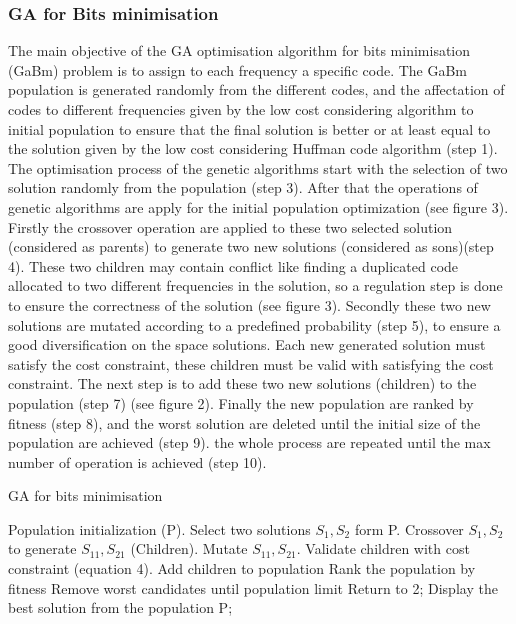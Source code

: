 \documentclass[preprint,12pt]{elsarticle}
\begin{document}
\subsubsection{GA for Bits minimisation}
The main objective of the GA optimisation algorithm for bits minimisation (GaBm) problem is to assign to each frequency a specific code. The GaBm population is generated randomly from the different codes, and the affectation of codes to different frequencies given by the low cost considering  algorithm  to initial population to ensure that the final solution is better or at least equal to the solution given by the low cost considering Huffman code algorithm (step 1). The optimisation process of the genetic algorithms start with the selection of two solution randomly from the population (step 3). After that the operations of genetic algorithms are apply for the initial population optimization (see figure 3). Firstly the crossover operation are applied to these two selected solution (considered as parents) to generate two new solutions (considered as sons)(step 4). These two children may contain conflict like finding a duplicated code allocated to two different frequencies in the solution, so a regulation step is done to ensure the correctness of the solution (see figure 3). Secondly these two new solutions are mutated according to a predefined probability (step 5), to ensure a good diversification on the space solutions. Each new generated solution must satisfy the cost constraint, these children must be valid with satisfying the cost constraint. The next step is to add these two new solutions (children) to the population (step 7) (see figure 2). Finally the new population are ranked by fitness (step 8), and the worst solution are deleted until the initial size of the population are achieved  (step 9). the whole process are repeated until the max number of operation is achieved (step 10). 
\begin{algorithm}
\caption{GA for bits minimisation}
\begin{algorithmic}[1]
\State Population initialization (P).
\State Select two solutions $S_{1},S_{2}$ form P.
\State Crossover $S_{1},S_{2}$ to generate $S_{11},S_{21}$ (Children).
\State Mutate $S_{11},S_{21}$.
\State Validate children with cost constraint (equation 4). 
\State Add children to population
\State Rank the population by fitness
\State Remove worst candidates until population limit
\State Return to 2;
\EndWhile
\State Display the best solution from the population P;
\end{algorithmic}
\end{algorithm}
\end{document}
